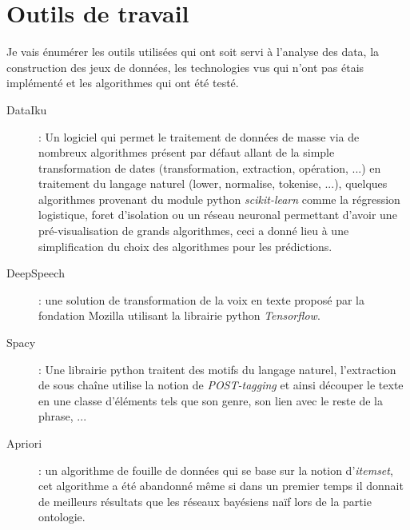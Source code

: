 \section{Outils de travail}
Je vais énumérer les outils utilisées qui ont soit servi à l'analyse des data, la construction des jeux de données, les technologies vus qui n'ont pas étais implémenté et les algorithmes qui ont été testé.\\
\linebreak
\begin{description}
\item[DataIku]: Un logiciel qui permet le traitement de données de masse via de nombreux algorithmes présent par défaut allant de la simple transformation de dates (transformation, extraction, opération, ...) en traitement du langage naturel (lower, normalise, tokenise, ...), quelques algorithmes provenant du module python \textit{scikit-learn} comme la régression logistique, foret d'isolation ou un réseau neuronal permettant d'avoir une pré-visualisation de grands algorithmes, ceci a donné lieu à une simplification du choix des algorithmes pour les prédictions.
\item[DeepSpeech]: une solution de transformation de la voix en texte proposé par la fondation Mozilla utilisant la librairie python \textit{Tensorflow}.
\item[Spacy]: Une librairie python traitent des motifs du langage naturel, l'extraction de sous chaîne utilise la notion de \textit{POST-tagging} et ainsi découper le texte en une classe d'éléments tels que son genre, son lien avec le reste de la phrase, ...
\item[Apriori]: un algorithme de fouille de données qui se base sur la notion d'\textit{itemset}, cet algorithme a été abandonné même si dans un premier temps il donnait de meilleurs résultats que les réseaux bayésiens naïf lors de la partie ontologie.
\end{description}

\pagebreak
